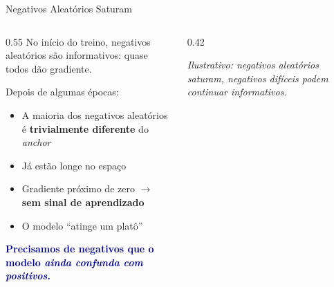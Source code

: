 \documentclass[aspectratio=169, xcolor=dvipsnames]{beamer}
\begin{document}
  \begin{frame}{Negativos Aleatórios Saturam}
    \begin{columns}
      \begin{column}{0.55\textwidth}
        No início do treino, negativos aleatórios são informativos: quase todos dão gradiente.

        \vspace{0.3em}
        Depois de algumas épocas:
        \begin{itemize}
          \item A maioria dos negativos aleatórios é \textbf{trivialmente diferente} do \textit{anchor}
          \item Já estão longe no espaço
          \item Gradiente próximo de zero $\to$ \textbf{sem sinal de aprendizado}
          \item O modelo ``atinge um platô''
        \end{itemize}
        \vspace{0.3em}
        \textcolor{DarkBlue}{\textbf{Precisamos de negativos que o modelo \textit{ainda confunda com positivos}.}}
      \end{column}
      \begin{column}{0.42\textwidth}

        {\scriptsize\textit{Ilustrativo: negativos aleatórios saturam, negativos difíceis podem continuar informativos.}}
      \end{column}
    \end{columns}
  \end{frame}
\end{document}
